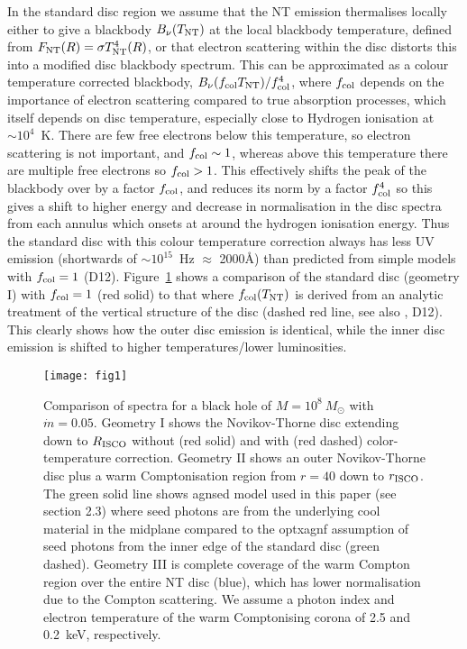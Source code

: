 \documentclass[a4paper,fleqn,usenatbib]{mnras}
\begin{document}
In the standard disc region we assume that the NT emission thermalises
locally either to give a blackbody $B_\nu(T_{\rm NT})$ at the local blackbody
temperature, defined from ${F}_{\rm NT}(R)=\sigma T_{\rm NT}^4(R)$, or
that electron scattering within the disc distorts this into a modified
disc blackbody spectrum. This can be approximated as a colour
temperature corrected blackbody, $B_\nu(f_{\rm col}T_{\rm NT})/f_{\rm col}^4$,
where $f_{\rm col}$ depends on the importance of electron scattering
compared to true absorption processes, which itself depends on disc
temperature, especially close to Hydrogen ionisation at $\sim
10^4$~K. There are few free electrons below this temperature, so
electron scattering is not important, and $f_{\rm col}\sim 1$, whereas
above this temperature there are multiple free electrons so $f_{\rm
  col}> 1$.  This effectively shifts the peak of the blackbody over by
a factor $f_{\rm col}$, and reduces its norm by a factor $f_{\rm col}^4$ so
this gives a shift to higher energy and decrease in normalisation in
the disc spectra from each annulus which onsets at around the hydrogen
ionisation energy. Thus the standard disc with this colour temperature
correction always has less UV emission (shortwards of $\sim
10^{15}$~Hz $\approx$ 2000\AA) than predicted from simple models with $f_{\rm
  col}=1$ (D12).  
%
Figure~\ref{fig:comparison} shows a comparison of the
standard disc (geometry I) with $f_{\rm col}=1$ (red solid) to that
where $f_{\rm col}(T_{\rm NT})$ is
derived from an analytic treatment of the vertical structure of the
disc (dashed red line, see also 
\citealt{davis2006}, D12). This clearly shows how the
outer disc emission is identical, while the inner disc emission is shifted to
higher temperatures/lower luminosities. 

\begin{figure}
\begin{center}
	\texttt{[image: fig1]}
\end{center}
\caption{Comparison of spectra for a black hole of $M= 10^8~M_\odot$
  with $\dot{m}=0.05$. Geometry I shows the Novikov-Thorne disc
  extending down to $R_{\rm ISCO}$ without (red solid) and with (red
  dashed) color-temperature correction. Geometry II shows an outer
  Novikov-Thorne disc plus a warm Comptonisation region from
  $r=40$ down to $r_{\rm ISCO}$. The green solid line shows
  {\sc agnsed} model used in this paper (see section 2.3) where seed photons are from the underlying cool
  material in the midplane compared to the {\sc optxagnf} assumption
  of seed photons from the inner edge of the standard disc (green
  dashed). Geometry III is complete coverage of the warm Compton region
  over the entire NT disc (blue), which has lower normalisation due to
the Compton scattering. We assume a photon index and electron temperature of the warm Comptonising corona of 2.5 and 0.2~keV, respectively.}    \label{fig:comparison}
\end{figure}
\end{document}
